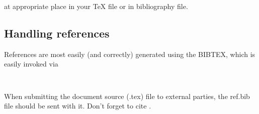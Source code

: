\documentclass{juliacon}
\begin{document}

at appropriate place in your \TeX{} file or in bibliography file.

\subsection{Handling references}
\label{subsub:references}
References are most easily (and correctly) generated using the
BIBTEX, which is easily invoked via
\begin{verbatim}


\end{verbatim}
When submitting the document source (.tex) file to external
parties, the ref.bib file should be sent with it.
Don't forget to cite \cite{bezanson2017julia}.




\end{document}
